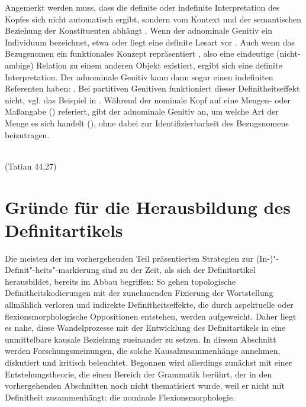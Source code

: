\noindent
 Angemerkt werden muss, dass die definite oder indefinite Interpretation des Kopfes sich nicht automatisch ergibt, sondern vom Kontext und der semantischen Beziehung der Konstituenten abhängt \parencite[237]{Oubouzar1997}.
Wenn der adnominale Genitiv ein Individuum bezeichnet, etwa   oder   liegt eine definite Lesart vor \parencite[vgl. auch][194]{Szczepaniak2015}. Auch wenn das Bezugsnomen ein funktionales Konzept repräsentiert \parencite{Lobner1985}, also eine eindeutige (nicht-ambige) Relation zu einem anderen Objekt existiert, ergibt sich eine definite Interpretation. Der adnominale Genitiv kann dann sogar einen indefiniten Referenten haben:  \parencite[109]{Demske2001}. Bei partitiven Genitiven funktioniert dieser Definitheitseffekt nicht, vgl. das Beispiel in  \parencite[s. auch][194]{Szczepaniak2015}. Während der nominale Kopf auf eine Mengen- oder Maßangabe () referiert, gibt der adnominale Genitiv an, um welche Art der Menge es sich handelt (), ohne dabei zur Identifizierbarkeit des Bezugsnomens beizutragen. 

\begin{exe}
	\ex \label{ex:partitiv-ahd}   
	  \\
	 (Tatian 44,27)
\end{exe}

\section{Gründe für die Herausbildung des Definitartikels}\label{sec:gruende}

Die meisten der im vorhergehenden Teil präsentierten Strategien zur (In-)"-Definit"-heits"-markierung sind zu der Zeit, als sich der Definitartikel herausbildet, bereits im Abbau begriffen: So gehen topologische Definitheitskodierungen mit der zunehmenden Fixierung der Wortstellung allmählich verloren und indirekte Definitheitseffekte, die durch aspektuelle oder flexionsmorphologische Oppositionen entstehen, werden aufgeweicht. Daher liegt es nahe, diese Wandelprozesse mit der Entwicklung des Definitartikels in eine unmittelbare kausale Beziehung zueinander zu setzen. In diesem Abschnitt werden Forschungsmeinungen, die solche Kausalzusammenhänge annehmen, diskutiert und kritisch beleuchtet. Begonnen wird allerdings zunächst mit einer Entstehungstheorie, die einen Bereich der Grammatik berührt, der in den vorhergehenden Abschnitten noch nicht thematisiert wurde, weil er nicht mit Definitheit zusammenhängt: die nominale Flexionsmorphologie. 

